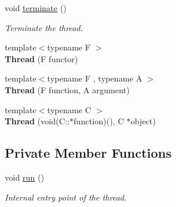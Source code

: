 \begin{DoxyCompactItemize}
void \mbox{\hyperlink{classsf_1_1_thread_ad6b205d4f1ce38b8d44bba0f5501477c}{terminate}} ()
\begin{DoxyCompactList}\small\item\em Terminate the thread. \end{DoxyCompactList}\item 
\mbox{\label{classsf_1_1_thread_a00b88f036de66eb63765f4c12ceb6870}} 
{\footnotesize template$<$typename F $>$ }\\{\bfseries Thread} (F functor)
\item 
\mbox{\label{classsf_1_1_thread_a719b2cc067d92d52c35064a49d850a53}} 
{\footnotesize template$<$typename F , typename A $>$ }\\{\bfseries Thread} (F function, A argument)
\item 
\mbox{\label{classsf_1_1_thread_aa9f473c8cbb078900c62b1fd14a83a34}} 
{\footnotesize template$<$typename C $>$ }\\{\bfseries Thread} (void(C\+::$\ast$function)(), C $\ast$object)
\end{DoxyCompactItemize}
\subsection*{Private Member Functions}
\begin{DoxyCompactItemize}
\item 
void \mbox{\hyperlink{classsf_1_1_thread_a593508379bd38e0b42ebf9f5a7e2829c}{run}} ()
\begin{DoxyCompactList}\small\item\em Internal entry point of the thread. \end{DoxyCompactList}\end{DoxyCompactItemize}
